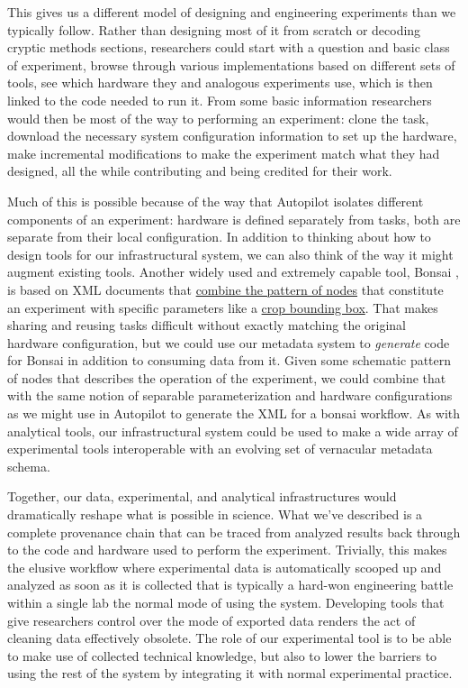 This gives us a different model of designing and engineering experiments
than we typically follow. Rather than designing most of it from scratch
or decoding cryptic methods sections, researchers could start with a
question and basic class of experiment, browse through various
implementations based on different sets of tools, see which hardware
they and analogous experiments use, which is then linked to the code
needed to run it. From some basic information researchers would then be
most of the way to performing an experiment: clone the task, download
the necessary system configuration information to set up the hardware,
make incremental modifications to make the experiment match what they
had designed, all the while contributing and being credited for their
work.

Much of this is possible because of the way that Autopilot isolates
different components of an experiment: hardware is defined separately
from tasks, both are separate from their local configuration. In
addition to thinking about how to design tools for our infrastructural
system, we can also think of the way it might augment existing tools.
Another widely used and extremely capable tool, Bonsai \citep{lopesBonsaiEventbasedFramework2015a, lopesNewOpenSourceTools2021} , is
based on XML documents that
\href{https://github.com/bonsai-rx/bonsai-examples/blob/cbc2c1decc11e1dc1df920421ef88a16fd2e184c/RoiTrigger/RoiTrigger.bonsai}{combine
the pattern of nodes} that constitute an experiment with specific
parameters like a
\href{https://github.com/bonsai-rx/bonsai-examples/blob/cbc2c1decc11e1dc1df920421ef88a16fd2e184c/RoiTrigger/RoiTrigger.bonsai\#L76-L85}{crop
bounding box}. That makes sharing and reusing tasks difficult without
exactly matching the original hardware configuration, but we could use
our metadata system to \emph{generate} code for Bonsai in addition to
consuming data from it. Given some schematic pattern of nodes that
describes the operation of the experiment, we could combine that with
the same notion of separable parameterization and hardware
configurations as we might use in Autopilot to generate the XML for a
bonsai workflow. As with analytical tools, our infrastructural system
could be used to make a wide array of experimental tools interoperable
with an evolving set of vernacular metadata schema.

Together, our data, experimental, and analytical infrastructures would
dramatically reshape what is possible in science. What we've described
is a complete provenance chain that can be traced from analyzed results
back through to the code and hardware used to perform the experiment.
Trivially, this makes the elusive workflow where experimental data is
automatically scooped up and analyzed as soon as it is collected that is
typically a hard-won engineering battle within a single lab the normal
mode of using the system. Developing tools that give researchers control
over the mode of exported data renders the act of cleaning data
effectively obsolete. The role of our experimental tool is to be able to
make use of collected technical knowledge, but also to lower the
barriers to using the rest of the system by integrating it with normal
experimental practice.

